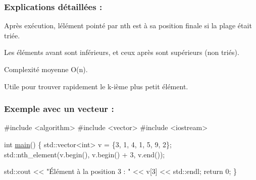 \subsubsection*{Explications détaillées \+:}


\begin{DoxyItemize}
\item Après exécution, l\textquotesingle{}élément pointé par {\ttfamily nth} est à sa position finale si la plage était triée.
\item Les éléments avant sont inférieurs, et ceux après sont supérieurs (non triés).
\item Complexité moyenne O(n).
\item Utile pour trouver rapidement le k-\/ième plus petit élément.
\end{DoxyItemize}

\subsubsection*{Exemple avec un vecteur \+:}


\begin{DoxyCode}
\textcolor{preprocessor}{#include <algorithm>}
\textcolor{preprocessor}{#include <vector>}
\textcolor{preprocessor}{#include <iostream>}

\textcolor{keywordtype}{int} \hyperlink{htop_8c_a3c04138a5bfe5d72780bb7e82a18e627}{main}() \{
    std::vector<int> v = \{3, 1, 4, 1, 5, 9, 2\};
    std::nth\_element(v.begin(), v.begin() + 3, v.end());

    std::cout << \textcolor{stringliteral}{"Élément à la position 3 : "} << v[3] << std::endl;
    \textcolor{keywordflow}{return} 0;
\}
\end{DoxyCode}
 